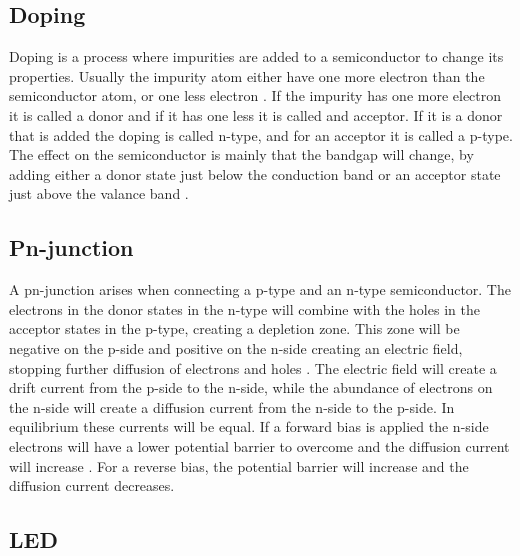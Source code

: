 \subsection{Doping}
Doping is a process where impurities are added to a semiconductor to change its properties. Usually the impurity atom either have one more electron than the semiconductor atom, or one less electron \cite{hofmann2015}. If the impurity has one more electron it is called a donor and if it has one less it is called and acceptor. If it is a donor that is added the doping is called n-type, and for an acceptor it is called a p-type. The effect on the semiconductor is mainly that the bandgap will change, by adding either a donor state just below the conduction band or an acceptor state just above the valance band \cite{hofmann2015}.

\subsection{Pn-junction}
A pn-junction arises when connecting a p-type and an n-type semiconductor. The electrons in the donor states in the n-type will combine with the holes in the acceptor states in the p-type, creating a depletion zone. This zone will be negative on the p-side and positive on the n-side creating an electric field, stopping further diffusion of electrons and holes \cite{hofmann2015}. The electric field will create a drift current from the p-side to the n-side, while the abundance of electrons on the n-side will create a diffusion current from the n-side to the p-side. In equilibrium these currents will be equal. If a forward bias is applied the n-side electrons will have a lower potential barrier to overcome and the diffusion current will increase \cite{hofmann2015}. For a reverse bias, the potential barrier will increase and the diffusion current decreases.


\subsection{LED}